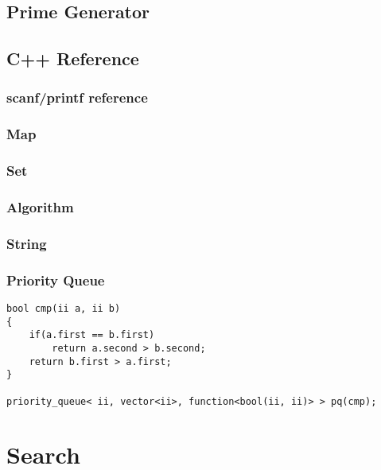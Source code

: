 \documentclass[10pt,oneside]{article}
\begin{document}
\begin{landscape}
\begin{multicols}{2}


\subsection{Prime Generator}


\subsection{C++ Reference}

\subsubsection{scanf/printf reference}

\subsubsection{Map}


\subsubsection{Set}


\subsubsection{Algorithm}


\subsubsection{String}

\subsubsection{Priority Queue}

\begin{lstlisting}
bool cmp(ii a, ii b)
{
    if(a.first == b.first)
		return a.second > b.second;
    return b.first > a.first;
}

priority_queue< ii, vector<ii>, function<bool(ii, ii)> > pq(cmp);
\end{lstlisting}


\section{Search}


\end{multicols}
\end{landscape}
\end{document}
